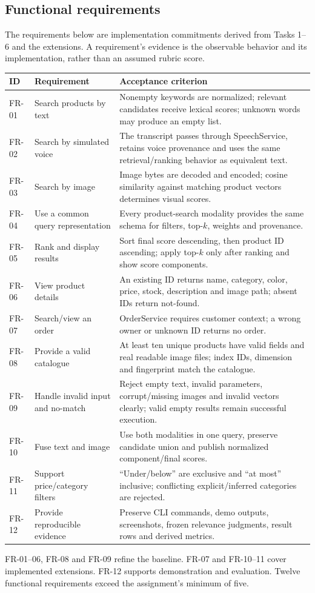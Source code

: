 \documentclass[11pt,a4paper]{article}
\begin{document}
\subsection{Functional requirements}
The requirements below are implementation commitments derived from Tasks 1--6 and the extensions. A requirement's evidence is the observable behavior and its implementation, rather than an assumed rubric score.
\begin{longtable}{@{}P{1.2cm}P{5.3cm}P{8.9cm}@{}}
\toprule\textbf{ID}&\textbf{Requirement}&\textbf{Acceptance criterion}\\\midrule\endhead
FR-01&Search products by text&Nonempty keywords are normalized; relevant candidates receive lexical scores; unknown words may produce an empty list.\\
FR-02&Search by simulated voice&The transcript passes through SpeechService, retains voice provenance and uses the same retrieval/ranking behavior as equivalent text.\\
FR-03&Search by image&Image bytes are decoded and encoded; cosine similarity against matching product vectors determines visual scores.\\
FR-04&Use a common query representation&Every product-search modality provides the same schema for filters, top-$k$, weights and provenance.\\
FR-05&Rank and display results&Sort final score descending, then product ID ascending; apply top-$k$ only after ranking and show score components.\\
FR-06&View product details&An existing ID returns name, category, color, price, stock, description and image path; absent IDs return not-found.\\
FR-07&Search/view an order&OrderService requires customer context; a wrong owner or unknown ID returns no order.\\
FR-08&Provide a valid catalogue&At least ten unique products have valid fields and real readable image files; index IDs, dimension and fingerprint match the catalogue.\\
FR-09&Handle invalid input and no-match&Reject empty text, invalid parameters, corrupt/missing images and invalid vectors clearly; valid empty results remain successful execution.\\
FR-10&Fuse text and image&Use both modalities in one query, preserve candidate union and publish normalized component/final scores.\\
FR-11&Support price/category filters&``Under/below'' are exclusive and ``at most'' inclusive; conflicting explicit/inferred categories are rejected.\\
FR-12&Provide reproducible evidence&Preserve CLI commands, demo outputs, screenshots, frozen relevance judgments, result rows and derived metrics.\\\bottomrule
\end{longtable}
FR-01--06, FR-08 and FR-09 refine the baseline. FR-07 and FR-10--11 cover implemented extensions. FR-12 supports demonstration and evaluation. Twelve functional requirements exceed the assignment's minimum of five.
\end{document}
